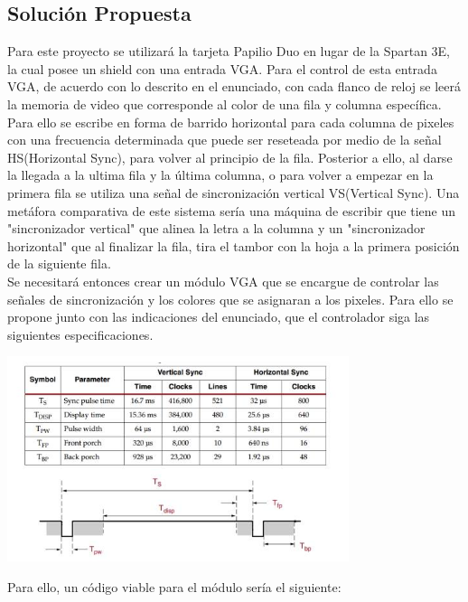 \documentclass[10pt]{article}
\begin{document}
\subsection*{Solución Propuesta}
Para este proyecto se utilizará la tarjeta Papilio Duo en lugar de la Spartan 3E, la cual posee un shield con una entrada VGA. Para el control de esta entrada VGA, de acuerdo con lo descrito en el enunciado, con cada flanco de reloj se leerá la memoria de video que corresponde al color de una fila y columna específica. Para ello se escribe en forma de barrido horizontal para cada columna de pixeles con una frecuencia determinada que puede ser reseteada por medio de la señal HS(Horizontal Sync), para volver al principio de la fila. Posterior a ello, al darse la llegada a la ultima fila y la última columna, o para volver a empezar en la primera fila se utiliza una señal de sincronización vertical VS(Vertical Sync). Una metáfora comparativa de este sistema sería una máquina de escribir que tiene un "sincronizador vertical" que alinea la letra a la columna y un "sincronizador horizontal" que al finalizar la fila, tira el tambor con la hoja a la primera posición de la siguiente fila. \\
Se necesitará entonces crear un módulo VGA que se encargue de controlar las señales de sincronización y los colores que se asignaran a los pixeles. Para ello se propone junto con las indicaciones del enunciado, que el controlador siga las siguientes especificaciones.
\begin{center}
\includegraphics[width= 10cm]{sinc.jpg}
\end{center}
\newpage
Para ello, un código viable para el módulo sería el siguiente:
\end{document}
